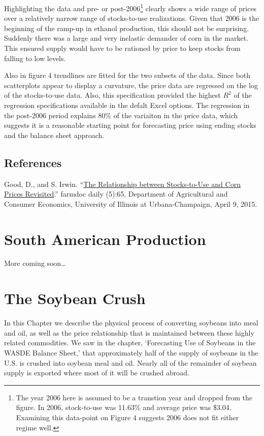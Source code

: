 \documentclass[]{book}
\let\rmarkdownfootnote\footnote%
\def\footnote{\protect\rmarkdownfootnote}
\theoremstyle{definition}
\theoremstyle{definition}
\theoremstyle{remark}
\begin{document}
Highlighting the data and pre- or post-2006\footnote{The year 2006 here
  is assumed to be a transtion year and dropped from the figure. In
  2006, stock-to-use was 11.63\% and average price was \$3.04. Examining
  this data-point on Figure 4 suggests 2006 does not fit either regime
  well.} clearly shows a wide range of prices over a relatively narrow
range of stocks-to-use realizations. Given that 2006 is the beginning of
the ramp-up in ethanol production, this should not be surprising.
Suddenly there was a large and very inelastic demander of corn in the
market. This ensured supply would have to be rationed by price to keep
stocks from falling to low levels.

Also in figure 4 trendlines are fitted for the two subsets of the data.
Since both scatterplots appear to display a curvature, the price data
are regressed on the log of the stocks-to-use data. Also, this
specification provided the highest \(R^2\) of the regression
specifications available in the defalt Excel options. The regression in
the post-2006 period explains 80\% of the variaiton in the price data,
which suggests it is a reasonable starting point for forecasting price
using ending stocks and the balance sheet approach.

\section{References}\label{references}

Good, D., and S. Irwin.
``\href{http://farmdocdaily.illinois.edu/2015/04/relationship-stock-to-use-and-corn-prices.html}{The
Relationship between Stocks-to-Use and Corn Prices Revisited}.'' farmdoc
daily (5):65, Department of Agricultural and Consumer Economics,
University of Illinois at Urbana-Champaign, April 9, 2015.

\chapter{South American Production}\label{south-american-production}

More coming soon\ldots{}

\chapter{The Soybean Crush}\label{the-soybean-crush}

In this Chapter we describe the physical process of converting soybeans
into meal and oil, as well as the price relationship that is maintained
between these highly related commodities. We saw in the chapter,
`Forecasting Use of Soybeans in the WASDE Balance Sheet,' that
approximately half of the supply of soybeans in the U.S. is crushed into
soybean meal and oil. Nearly all of the remainder of soybean supply is
exported where most of it will be crushed abroad.
\end{document}
